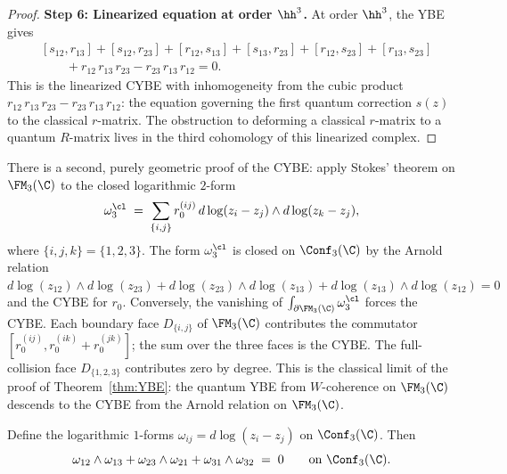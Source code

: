 \begin{proof}
\medskip
\noindent\textbf{Step 6: Linearized equation at order $\hh^3$.}
At order $\hh^3$, the YBE gives
\begin{align*}
&[s_{12}, r_{13}] + [s_{12}, r_{23}]
+ [r_{12}, s_{13}] + [s_{13}, r_{23}]
+ [r_{12}, s_{23}] + [r_{13}, s_{23}] \\
&\qquad + r_{12}\, r_{13}\, r_{23} - r_{23}\, r_{13}\, r_{12} = 0.
\end{align*}
This is the linearized CYBE with inhomogeneity from the cubic
product $r_{12}\, r_{13}\, r_{23} - r_{23}\, r_{13}\, r_{12}$:
the equation governing the first quantum correction $s(z)$ to
the classical $r$-matrix. The obstruction to deforming a classical
$r$-matrix to a quantum $R$-matrix lives in the third cohomology
of this linearized complex.
\end{proof}

\begin{remark}
There is a second, purely geometric proof of the CYBE: apply
Stokes' theorem on $\FM_3(\C)$ to the closed logarithmic
$2$-form
\[
\omega_{3}^{\cl}
\;=\;
\sum_{\{i,j\}} r_0^{(ij)}\,
d\log(z_i - z_j) \wedge d\log(z_k - z_j),
\]
where $\{i,j,k\} = \{1,2,3\}$. The form $\omega_3^{\cl}$ is
closed on $\Conf_3(\C)$ by the Arnold relation
$d\log(z_{12}) \wedge d\log(z_{23})
+ d\log(z_{23}) \wedge d\log(z_{13})
+ d\log(z_{13}) \wedge d\log(z_{12}) = 0$
and the CYBE for $r_0$. Conversely, the vanishing of
$\int_{\partial \FM_3(\C)} \omega_3^{\cl}$ forces the CYBE. Each
boundary face $D_{\{i,j\}}$ of $\FM_3(\C)$ contributes the
commutator $[r_0^{(ij)}, r_0^{(ik)} + r_0^{(jk)}]$; the sum
over the three faces is the CYBE. The full-collision face
$D_{\{1,2,3\}}$ contributes zero by degree. This is the
classical limit of the proof of Theorem~\ref{thm:YBE}: the
quantum YBE from $W$-coherence on $\FM_3(\C)$ descends to the
CYBE from the Arnold relation on $\FM_3(\C)$.
\end{remark}

\begin{lemma}
Define the logarithmic $1$-forms $\omega_{ij} = d\log(z_i - z_j)$
on $\Conf_3(\C)$. Then
\begin{equation}%
\omega_{12} \wedge \omega_{13}
+ \omega_{23} \wedge \omega_{21}
+ \omega_{31} \wedge \omega_{32}
\;=\; 0
\qquad \text{on } \Conf_3(\C).
\end{equation}
\end{lemma}

